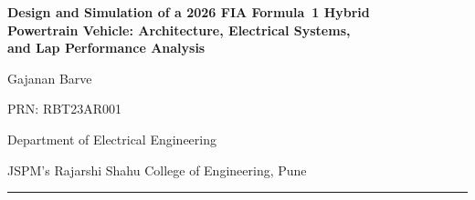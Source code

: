 \documentclass[12pt, a4paper]{article}
\begin{document}
\begin{center}
  {\LARGE\bfseries Design and Simulation of a 2026 FIA Formula~1 Hybrid\\[4pt]
   Powertrain Vehicle: Architecture, Electrical Systems,\\[4pt]
   and Lap Performance Analysis\par}
  \vspace{1.2em}
  {\large Gajanan Barve\par}
  \vspace{0.4em}
  {\normalsize PRN: RBT23AR001\par}
  \vspace{0.3em}
  {\normalsize Department of Electrical Engineering\par}
  \vspace{0.2em}
  {\normalsize JSPM's Rajarshi Shahu College of Engineering, Pune\par}
\end{center}

\vspace{0.6em}
\noindent\rule{\textwidth}{0.4pt}
\end{document}
